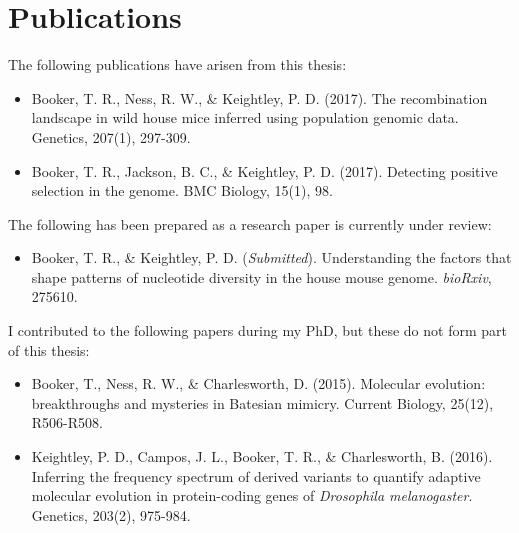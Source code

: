 \chapter{Publications}
\singlespacing
\noindent
The following publications have arisen from this thesis:
\begin{itemize}
\item Booker, T. R., Ness, R. W., \& Keightley, P. D. (2017). The recombination landscape in wild house mice inferred using population genomic data. Genetics, 207(1), 297-309.
\item Booker, T. R., Jackson, B. C., \& Keightley, P. D. (2017). Detecting positive selection in the genome. BMC Biology, 15(1), 98.
\end{itemize}
 
\noindent
The following has been prepared as a research paper is currently under review:
\begin{itemize}
\item Booker, T. R., \& Keightley, P. D. (\textit{Submitted}). Understanding the factors that shape patterns of nucleotide diversity in the house mouse genome. \textit{bioRxiv}, 275610.
\end{itemize}
 
\noindent
I contributed to the following papers during my PhD, but these do not form part of this thesis:
\begin{itemize}
\item Booker, T., Ness, R. W., \& Charlesworth, D. (2015). Molecular evolution: breakthroughs and mysteries in Batesian mimicry. Current Biology, 25(12), R506-R508.
\item Keightley, P. D., Campos, J. L., Booker, T. R., \& Charlesworth, B. (2016). Inferring the frequency spectrum of derived variants to quantify adaptive molecular evolution in protein-coding genes of \textit{Drosophila melanogaster}. Genetics, 203(2), 975-984.
\end{itemize}
  \doublespacing